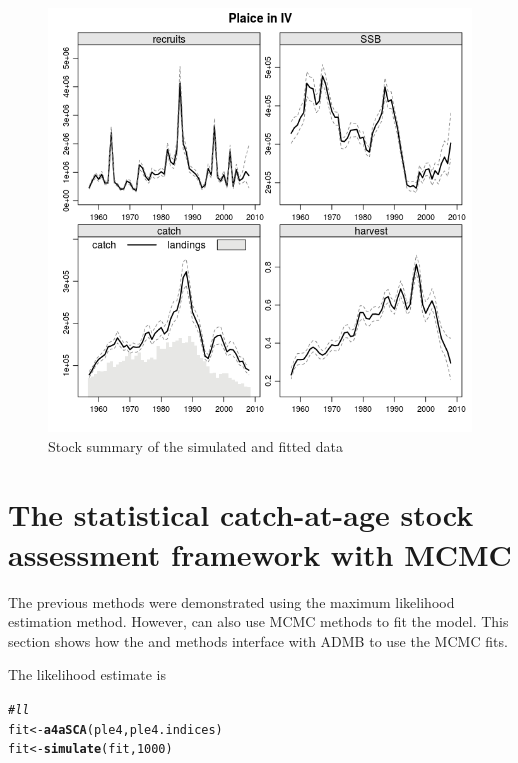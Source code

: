 \documentclass[a4paper,english,10pt]{article}\usepackage[]{graphicx}\usepackage[]{color}
\makeatletter
\def\maxwidth{ %
  \ifdim\Gin@nat@width>\linewidth
    \linewidth
  \else
    \Gin@nat@width
  \fi
}
\newcommand{\hlnum}[1]{\textcolor[rgb]{0.686,0.059,0.569}{#1}}%
\newcommand{\hlcom}[1]{\textcolor[rgb]{0.678,0.584,0.686}{\textit{#1}}}%
\newcommand{\hlstd}[1]{\textcolor[rgb]{0.345,0.345,0.345}{#1}}%
\newcommand{\hlkwb}[1]{\textcolor[rgb]{0.69,0.353,0.396}{#1}}%
\newcommand{\hlkwd}[1]{\textcolor[rgb]{0.737,0.353,0.396}{\textbf{#1}}}%
\newenvironment{kframe}{%
 \def\at@end@of@kframe{}%
 \ifinner\ifhmode%
  \def\at@end@of@kframe{\end{minipage}}%
  \begin{minipage}{\columnwidth}%
 \fi\fi%
 \def\FrameCommand##1{\hskip\@totalleftmargin \hskip-\fboxsep
 \colorbox{shadecolor}{##1}\hskip-\fboxsep
     \hskip-\linewidth \hskip-\@totalleftmargin \hskip\columnwidth}%
 \MakeFramed {\advance\hsize-\width
   \@totalleftmargin\z@ \linewidth\hsize
   \@setminipage}}%
 {\par\unskip\endMakeFramed%
 \at@end@of@kframe}
\newenvironment{knitrout}{}{} %
\makeatother
\begin{document}
\begin{knitrout}
\color{fgcolor}\begin{figure}[H]

{\centering \includegraphics[width=\maxwidth]{figure/sim2-1} 

}

\caption[Stock summary of the simulated and fitted data]{Stock summary of the simulated and fitted data}\label{fig:sim2}
\end{figure}


\end{knitrout}

\section{The statistical catch-at-age stock assessment framework with MCMC}

The previous methods were demonstrated using the maximum likelihood estimation method. However,  can also use MCMC methods to fit the model. This section shows how the  and  methods interface with ADMB to use the MCMC fits.

The likelihood estimate is

\begin{knitrout}
\color{fgcolor}\begin{kframe}
\begin{alltt}
\hlcom{# ll}
\hlstd{fit} \hlkwb{<-} \hlkwd{a4aSCA}\hlstd{(ple4, ple4.indices)}
\hlstd{fit} \hlkwb{<-} \hlkwd{simulate}\hlstd{(fit,} \hlnum{1000}\hlstd{)}
\end{alltt}
\end{kframe}
\end{knitrout}
\end{document}
